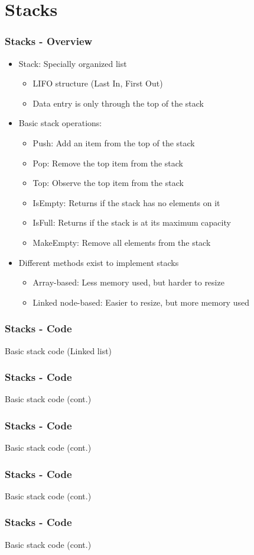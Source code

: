 \section{Stacks}
\begin{frame}\frametitle{Stacks - Overview}
\begin{itemize}
\item Stack: Specially organized list
	\begin{itemize}
	\item LIFO structure (Last In, First Out)
	\item Data entry is only through the top of the stack
	\end{itemize}
\item Basic stack operations:
	\begin{itemize}
	\item Push: Add an item from the top of the stack
	\item Pop: Remove the top item from the stack
	\item Top: Observe the top item from the stack
	\item IsEmpty: Returns if the stack has no elements on it
	\item IsFull: Returns if the stack is at its maximum capacity
	\item MakeEmpty: Remove all elements from the stack
\end{itemize}
\item Different methods exist to implement stacks
	\begin{itemize}
	\item Array-based: Less memory used, but harder to resize
	\item Linked node-based: Easier to resize, but more memory used
	\end{itemize}
\end{itemize}
\end{frame}

\begin{frame}\frametitle{Stacks - Code}
Basic stack code (Linked list)

%
\end{frame}

\begin{frame}\frametitle{Stacks - Code}
Basic stack code (cont.)

\end{frame}

\begin{frame}\frametitle{Stacks - Code}
Basic stack code (cont.)

\end{frame}

\begin{frame}\frametitle{Stacks - Code}
Basic stack code (cont.)

\end{frame}

\begin{frame}\frametitle{Stacks - Code}
Basic stack code (cont.)

\end{frame}
